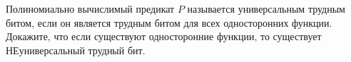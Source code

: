 Полиномиально вычислимый предикат $P$ называется универсальным трудным битом, если он является трудным
битом для всех односторонних функции. Докажите, что если существуют односторонние функции, то существует
НЕуниверсальный трудный бит.
